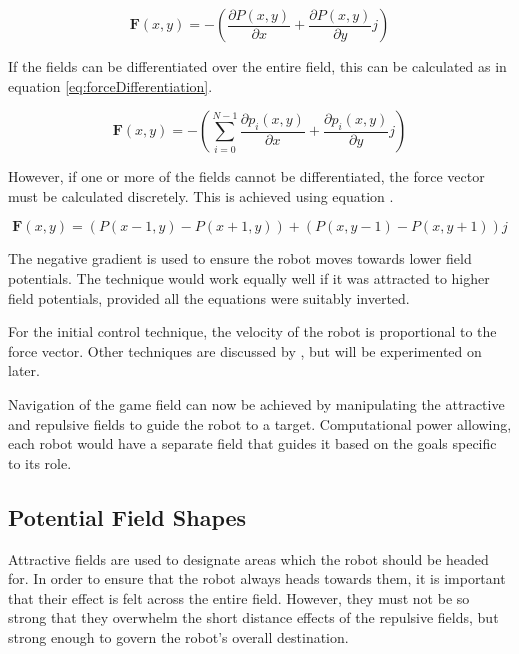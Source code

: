 \documentclass[10pt,british,english]{article}
\begin{document}
\begin{equation}
\boldsymbol{F}(x,y)=-\left(\frac{{\partial P\left(x,y\right)}}{\partial x}+\frac{{\partial P\left(x,y\right)}}{\partial y}j\right)\label{eq:forceSummation}
\end{equation}

If the fields can be differentiated over the entire field, this can be calculated as in equation \ref{eq:forceDifferentiation}.

\begin{equation}
\boldsymbol{F}(x,y)=-\left(\sum_{i=0}^{N-1}\frac{\partial p_{i}\left(x,y\right)}{\partial x}+\frac{\partial p_{i}\left(x,y\right)}{\partial y}j\right)\label{eq:forceDifferentiation}
\end{equation}

However, if one or more of the fields cannot be differentiated, the force vector must be calculated discretely. This is achieved using equation .

\begin{equation}
\boldsymbol{F}(x,y)=\left(P\left(x-1,y\right)-P\left(x+1,y\right)\right)+\left(P\left(x,y-1\right)-P\left(x,y+1\right)\right)j
\end{equation}

The negative gradient is used to ensure the robot moves towards lower field potentials. The technique would work equally well if it was attracted to higher field potentials, provided all the equations were suitably inverted.

For the initial control technique, the velocity of the robot is proportional to the force vector. Other techniques are discussed by \cite{intelligentAlgorithmPathPlanning}, but will be experimented on later.

Navigation of the game field can now be achieved by manipulating the attractive and repulsive fields to guide the robot to a target. Computational power allowing, each robot would have a separate field that guides it based on the goals specific to its role.

\subsection{Potential Field Shapes}

Attractive fields are used to designate areas which the robot should be headed for. In order to ensure that the robot always heads towards them, it is important that their effect is felt across the entire field. However, they must not be so strong that they overwhelm the short distance effects of the repulsive fields, but strong enough to govern the robot's overall destination.
\end{document}
